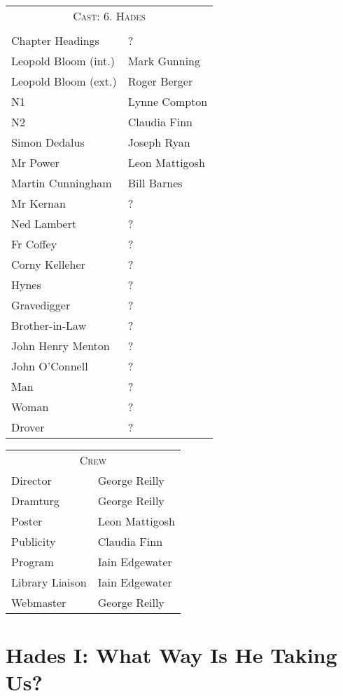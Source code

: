 \begin{tabular}{lp{10cm}}
    \multicolumn{2}{c}{\Large \textsc{Cast: 6. Hades}} \\
\\
Chapter Headings  & ?\\
Leopold Bloom (int.)  & Mark Gunning \\
Leopold Bloom (ext.)  & Roger Berger \\
N1  & Lynne Compton \\
N2  & Claudia Finn \\
Simon Dedalus  & Joseph Ryan \\
Mr Power  & Leon Mattigosh \\
Martin Cunningham  & Bill Barnes \\
Mr Kernan  & ?\\
Ned Lambert  & ?\\
Fr Coffey  & ?\\
Corny Kelleher  & ?\\
Hynes  & ?\\
Gravedigger  & ?\\
Brother-in-Law  & ?\\
John Henry Menton  & ?\\
John O'Connell  & ?\\
Man  & ?\\
Woman  & ?\\
Drover  & ?\\
\end{tabular}

\bigskip
\bigskip

\begin{tabular}{lp{10cm}}
    \multicolumn{2}{c}{\Large \textsc{Crew}} \\
Director & George Reilly \\
Dramturg & George Reilly \\
Poster & Leon Mattigosh \\
Publicity & Claudia Finn \\
Program & Iain Edgewater \\
Library Liaison & Iain Edgewater \\
Webmaster & George Reilly \\
\end{tabular}
\thispagestyle{empty}

\newpage


\setcounter{page}{1}

\section*{Hades I: What Way Is He Taking Us?}


